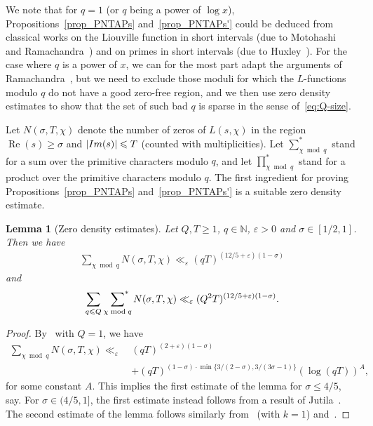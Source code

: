 \documentclass[11pt,letterpaper]{amsart}
\renewcommand{\leq}{\leqslant}
\renewcommand{\geq}{\geqslant}
\newtheorem{lemma}[theorem]{Lemma}
\theoremstyle{definition}
\numberwithin{equation}{section}
\newcommand{\asum}{\sideset{}{^{\ast}}\sum}
\DeclareMathOperator{\real}{Re}
\newcommand{\0}{\mathbf{0}}
\begin{document}
We note that for $q=1$ (or $q$ being a power of $\log x$), Propositions~\ref{prop_PNTAPs} and~\ref{prop_PNTAPs'} could be deduced from classical works on the Liouville function in short intervals (due to Motohashi~\cite{moto} and Ramachandra~\cite{rama}) and on primes in short intervals (due to Huxley~\cite{huxley-inventiones}). For the case where $q$ is a power of $x$, we can for the most part adapt the arguments of Ramachandra~\cite{rama}, but we need to exclude those moduli for which the $L$-functions modulo $q$ do not have a good zero-free region, and we then use zero density estimates to show that the set of such bad $q$ is sparse in the sense of~\eqref{eq:Q-size}.


Let $N(\sigma,T,\chi)$ denote the number of zeros of $L(s,\chi)$ in the region $\real(s)\geq \sigma$ and $|\textnormal{Im(s)}|\leq T$ (counted with multiplicities). Let $\sum^*_{\chi\bmod{q}}$ stand for a sum over the primitive characters modulo $q$, and let $\prod^*_{\chi\bmod{q}}$ stand for a product over the primitive characters modulo $q$. The first ingredient for proving Propositions~\ref{prop_PNTAPs} and~\ref{prop_PNTAPs'} is a suitable zero density estimate. 

\begin{lemma}[Zero density estimates] \label{le:zeros} Let $Q,T\geq 1$, $q\in \mathbb{N}$, $\varepsilon>0$ and $\sigma\in [1/2,1]$. Then we have
\begin{align*}
 \sum_{\chi\bmod q} N(\sigma,T,\chi)\ll_{\varepsilon} (qT)^{(12/5+\varepsilon)(1-\sigma)}   
\end{align*}
and
\begin{align*}
 \sum_{q\leq Q}\,\,\asum_{\chi\bmod q} N(\sigma,T,\chi)\ll_{\varepsilon} (Q^2T)^{(12/5+\varepsilon)(1-\sigma)}.      
\end{align*}
\end{lemma}

\begin{proof}
By~\cite[Grand Density Theorem 10.4 and the remark after it]{iw-kow} with $Q=1$, we have
\begin{align*}
 \sum_{\chi\bmod q} N(\sigma,T,\chi)\ll_{\varepsilon}~& (qT)^{(2+\varepsilon)(1-\sigma)}
\\ 
&  +(qT)^{(1-\sigma)\cdot\min\{3/(2-\sigma),3/(3\sigma-1)\}}(\log(qT))^{A}    ,
\end{align*}
for some constant $A$. This implies the first estimate of the lemma for $\sigma\leq 4/5$, say. For $\sigma\in (4/5,1]$, the first estimate instead follows from a result of Jutila~\cite{jutila}. The second estimate of the lemma follows similarly from~\cite[Grand density theorem 10.4]{iw-kow} (with $k=1$) and~\cite{jutila}. 
\end{proof}
\end{document}
